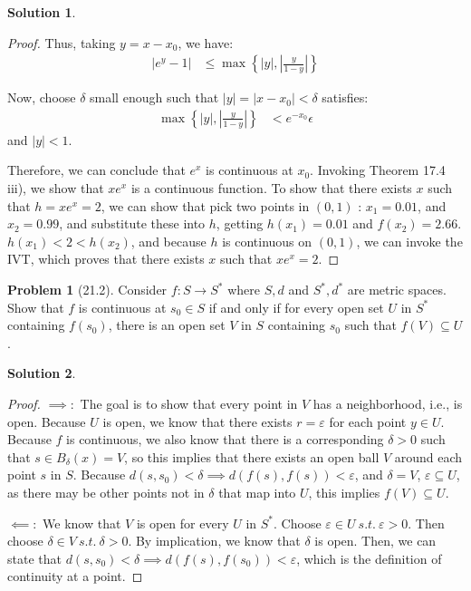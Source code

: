 \documentclass[12pt]{article}
\theoremstyle{definition} %
\newtheorem{solution}{Solution}
\newtheorem{problem}{Problem}
\theoremstyle{plain} %
\begin{document}
\begin{solution}
\begin{proof}
    Thus, taking $ y = x - x_0 $, we have:
    \begin{align}
    |e^y - 1| &\leq \max \left\{ |y|, \left| \frac{y}{1 - y} \right| \right\}
    \end{align}
    
    Now, choose $ \delta $ small enough such that $ |y| = |x - x_0| < \delta $ satisfies:
    \begin{align}
    \max \left\{ |y|, \left| \frac{y}{1 - y} \right| \right\} &< e^{-x_0} \epsilon
    \end{align}
    and $ |y| < 1 $.
    
    Therefore, we can conclude that $ e^x $ is continuous at $ x_0 $.
    \vspace{.5cm} 
    Invoking Theorem 17.4 iii), we show that $xe^{x}$ is a continuous function. To show that there exists $x$ such that $h=xe^{x}=2$, we can show that pick two points in $(0,1)$ : $x_1=0.01$, and $x_2=0.99$, and substitute these into $h$, getting $h(x_1)=0.01$ and $f(x_2)=2.66$. $h(x_1)<2<h(x_2)$, and because $h$ is continuous on $(0,1)$, we can invoke the IVT, which proves that there exists $x$ such that $xe^{x}=2$.  
  
  \end{proof}
\end{solution}
\begin{problem}[21.2]
    Consider $f:S\to S^{*}$ where $S,d$ and $S^{*}, d^{*}$ are metric spaces. Show that $f$ is continuous at $s_{0}\in S $ if and only if for every open set $U$ in $S^{*} $ containing $f(s_{0} )$, there is an open set $V$ in $S$ containing $s_{0}$ such that $f(V) \subseteq U$.
\end{problem}
\begin{solution}
\begin{proof}
  $\implies:$ The goal is to show that every point in $V$ has a neighborhood, i.e., is open. Because $U$ is open, we know that there exists $r=\varepsilon$ for each point $y\in U$. Because $f$ is continuous, we also know that there is a corresponding $\delta>0$ such that $s\in B_{\delta}(x)=V$, so this implies that there exists an open ball $V$ around each point $s$ in $S$. Because $d(s,s_0)<\delta \implies d(f(s),f(s))<\varepsilon$, and $\delta = V$, $\varepsilon \subseteq U$, as there may be other points not in $\delta$ that map into $U$, this implies $f(V)\subseteq U$. 
  \vspace{.5cm}

  $\impliedby:$ We know that $V$ is open for every $U$ in $S^{*}$. Choose $\varepsilon \in U \ s.t. \ \varepsilon >0$. Then choose $\delta \in V \ s.t. \ \delta >0$. By implication, we know that $\delta$ is open. Then, we can state that $d(s, s_0)<\delta \implies d(f(s),f(s_0))<\varepsilon$, which is the definition of continuity at a point.    
\end{proof}
\end{solution}
\end{document}
